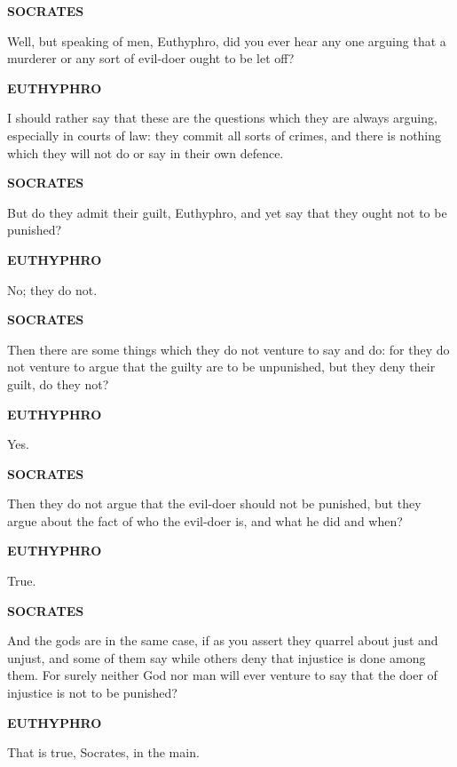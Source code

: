 \documentclass[11pt,letter]{article}
\begin{document}
\par \textbf{SOCRATES}
\par   Well, but speaking of men, Euthyphro, did you ever hear any one arguing that a murderer or any sort of evil-doer ought to be let off?

\par \textbf{EUTHYPHRO}
\par   I should rather say that these are the questions which they are always arguing, especially in courts of law:  they commit all sorts of crimes, and there is nothing which they will not do or say in their own defence.

\par \textbf{SOCRATES}
\par   But do they admit their guilt, Euthyphro, and yet say that they ought not to be punished?

\par \textbf{EUTHYPHRO}
\par   No; they do not.

\par \textbf{SOCRATES}
\par   Then there are some things which they do not venture to say and do:  for they do not venture to argue that the guilty are to be unpunished, but they deny their guilt, do they not?

\par \textbf{EUTHYPHRO}
\par   Yes.

\par \textbf{SOCRATES}
\par   Then they do not argue that the evil-doer should not be punished, but they argue about the fact of who the evil-doer is, and what he did and when?

\par \textbf{EUTHYPHRO}
\par   True.

\par \textbf{SOCRATES}
\par   And the gods are in the same case, if as you assert they quarrel about just and unjust, and some of them say while others deny that injustice is done among them. For surely neither God nor man will ever venture to say that the doer of injustice is not to be punished?

\par \textbf{EUTHYPHRO}
\par   That is true, Socrates, in the main.
\end{document}
